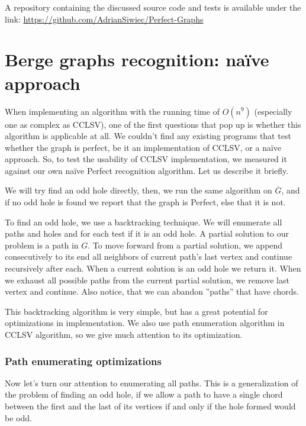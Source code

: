 A repository containing the discussed source code and tests is available under the link: \href{https://github.com/AdrianSiwiec/Perfect-Graphs}{https://github.com/AdrianSiwiec/Perfect-Graphs}

\section{Berge graphs recognition: na\"ive approach}
When implementing an algorithm with the running time of $O(n^9)$ (especially one as complex as CCLSV), one of the first questions that pop up is whether this algorithm is applicable at all. We couldn't find any existing programs that test whether the graph is perfect, be it an implementation of CCLSV, or a na\"ive approach. So, to test the usability of CCLSV implementation, we measured it against our own na\"ive Perfect recognition algorithm. Let us describe it briefly.

We will try find an odd hole directly, then, we run the same algorithm on $\overline{G}$, and if no odd hole is found we report that the graph is Perfect, else that it is not.

To find an odd hole, we use a backtracking technique. We will enumerate all paths and holes and for each test if it is an odd hole. A partial solution to our problem is a path in $G$. To move forward from a partial solution, we append consecutively to its end all neighbors of current path's last vertex and continue recursively after each. When a current solution is an odd hole we return it. When we exhaust all possible paths from the current partial solution, we remove last vertex and continue. Also notice, that we can abandon ''paths'' that have chords.

This backtracking algorithm is very simple, but has a great potential for optimizations in implementation. We also use path enumeration algorithm in CCLSV algorithm, so we give much attention to its optimization.

\subsubsection{Path enumerating optimizations}
Now let's turn our attention to enumerating all paths. This is a generalization of the problem of finding an odd hole, if we allow a path to have a single chord between the first and the last of its vertices if and only if the hole formed would be odd.


